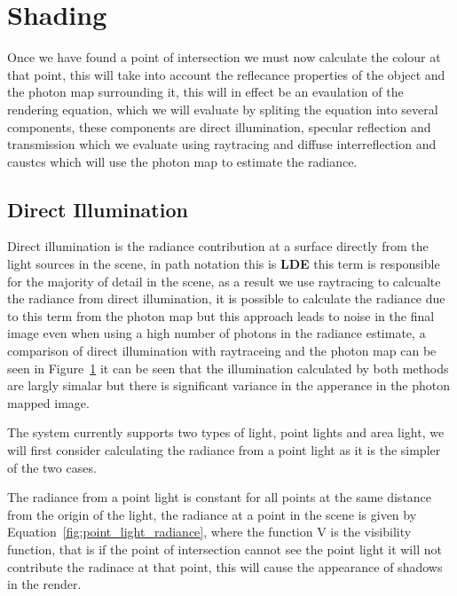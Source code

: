 \section{Shading}
Once we have found a point of intersection we must now calculate the colour at that point, this will take into account the
reflecance properties of the object and the photon map surrounding it, this will in effect be an evaulation of the rendering
equation, which we will evaluate by spliting the equation into several components, these components are direct illumination,
specular reflection and transmission which we evaluate using raytracing and diffuse interreflection and caustcs which will
use the photon map to estimate the radiance.

\subsection{Direct Illumination}
Direct illumination is the radiance contribution at a surface directly from the light sources in the scene, in path notation
this is \textbf{LDE} this term is responsible for the majority of detail in the scene, as a result we use raytracing to calcualte
the radiance from direct illumination, it is possible to calculate the radiance due to this term from the photon map but this
approach leads to noise in the final image even when using a high number of photons in the radiance estimate, a comparison of
direct illumination with raytraceing and the photon map can be seen in Figure~\ref{fig:direct_compare} it can be seen that
the illumination calculated by both methods are largly simalar but there is significant variance in the apperance in the
photon mapped image.

\begin{figure}
\label{fig:direct_compare}
\end{figure}

The system currently supports two types of light, point lights and area light, we will first consider calculating the radiance
from a point light as it is the simpler of the two cases.

The radiance from a point light is constant for all points at the same distance from the origin of the light, the radiance at
a point in the scene is given by Equation~\ref{fig:point_light_radiance}, where the function V is the visibility function, that
is if the point of intersection cannot see the point light it will not contribute the radinace at that point, this will cause
the appearance of shadows in the render.

